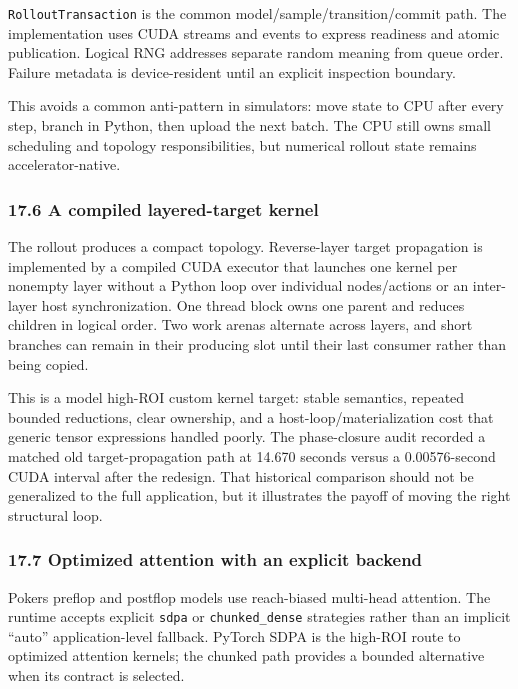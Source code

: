 \documentclass[
  10pt,
  letterpaper,
]{article}
\newcounter{none} %
\begin{document}
\texttt{RolloutTransaction} is the common model/sample/transition/commit
path. The implementation uses CUDA streams and events to express
readiness and atomic publication. Logical RNG addresses separate random
meaning from queue order. Failure metadata is device-resident until an
explicit inspection boundary.

This avoids a common anti-pattern in simulators: move state to CPU after
every step, branch in Python, then upload the next batch. The CPU still
owns small scheduling and topology responsibilities, but numerical
rollout state remains accelerator-native.

\subsubsection{17.6 A compiled layered-target
kernel}\label{176-a-compiled-layered-target-kernel}

The rollout produces a compact topology. Reverse-layer target
propagation is implemented by a compiled CUDA executor that launches one
kernel per nonempty layer without a Python loop over individual
nodes/actions or an inter-layer host synchronization. One thread block
owns one parent and reduces children in logical order. Two work arenas
alternate across layers, and short branches can remain in their
producing slot until their last consumer rather than being copied.

This is a model high-ROI custom kernel target: stable semantics,
repeated bounded reductions, clear ownership, and a
host-loop/materialization cost that generic tensor expressions handled
poorly. The phase-closure audit recorded a matched old
target-propagation path at 14.670 seconds versus a 0.00576-second CUDA
interval after the redesign. That historical comparison should not be
generalized to the full application, but it illustrates the payoff of
moving the right structural loop.

\subsubsection{17.7 Optimized attention with an explicit
backend}\label{177-optimized-attention-with-an-explicit-backend}

Poker\textquotesingle s preflop and postflop models use reach-biased
multi-head attention. The runtime accepts explicit \texttt{sdpa} or
\texttt{chunked\_dense} strategies rather than an implicit ``auto''
application-level fallback. PyTorch SDPA is the high-ROI route to
optimized attention kernels; the chunked path provides a bounded
alternative when its contract is selected.
\end{document}
